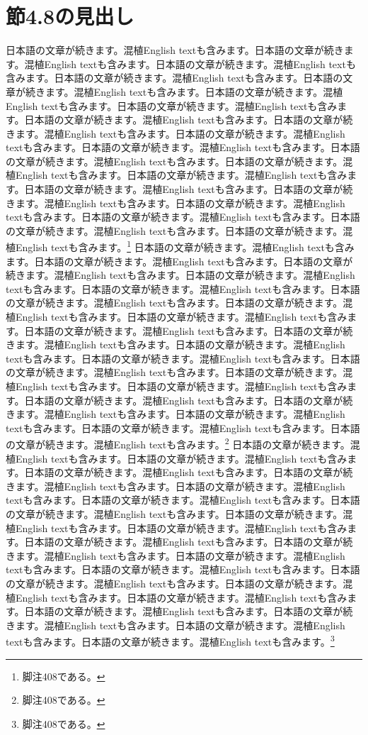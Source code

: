 \documentclass[pdflatex,book]{jlreq}
\begin{document}
\section{節4.8の見出し}
日本語の文章が続きます。混植English textも含みます。日本語の文章が続きます。混植English textも含みます。日本語の文章が続きます。混植English textも含みます。日本語の文章が続きます。混植English textも含みます。日本語の文章が続きます。混植English textも含みます。日本語の文章が続きます。混植English textも含みます。日本語の文章が続きます。混植English textも含みます。日本語の文章が続きます。混植English textも含みます。日本語の文章が続きます。混植English textも含みます。日本語の文章が続きます。混植English textも含みます。日本語の文章が続きます。混植English textも含みます。日本語の文章が続きます。混植English textも含みます。日本語の文章が続きます。混植English textも含みます。日本語の文章が続きます。混植English textも含みます。日本語の文章が続きます。混植English textも含みます。日本語の文章が続きます。混植English textも含みます。日本語の文章が続きます。混植English textも含みます。日本語の文章が続きます。混植English textも含みます。日本語の文章が続きます。混植English textも含みます。日本語の文章が続きます。混植English textも含みます。\footnote{脚注408である。}
日本語の文章が続きます。混植English textも含みます。日本語の文章が続きます。混植English textも含みます。日本語の文章が続きます。混植English textも含みます。日本語の文章が続きます。混植English textも含みます。日本語の文章が続きます。混植English textも含みます。日本語の文章が続きます。混植English textも含みます。日本語の文章が続きます。混植English textも含みます。日本語の文章が続きます。混植English textも含みます。日本語の文章が続きます。混植English textも含みます。日本語の文章が続きます。混植English textも含みます。日本語の文章が続きます。混植English textも含みます。日本語の文章が続きます。混植English textも含みます。日本語の文章が続きます。混植English textも含みます。日本語の文章が続きます。混植English textも含みます。日本語の文章が続きます。混植English textも含みます。日本語の文章が続きます。混植English textも含みます。日本語の文章が続きます。混植English textも含みます。日本語の文章が続きます。混植English textも含みます。日本語の文章が続きます。混植English textも含みます。日本語の文章が続きます。混植English textも含みます。\footnote{脚注408である。}
日本語の文章が続きます。混植English textも含みます。日本語の文章が続きます。混植English textも含みます。日本語の文章が続きます。混植English textも含みます。日本語の文章が続きます。混植English textも含みます。日本語の文章が続きます。混植English textも含みます。日本語の文章が続きます。混植English textも含みます。日本語の文章が続きます。混植English textも含みます。日本語の文章が続きます。混植English textも含みます。日本語の文章が続きます。混植English textも含みます。日本語の文章が続きます。混植English textも含みます。日本語の文章が続きます。混植English textも含みます。日本語の文章が続きます。混植English textも含みます。日本語の文章が続きます。混植English textも含みます。日本語の文章が続きます。混植English textも含みます。日本語の文章が続きます。混植English textも含みます。日本語の文章が続きます。混植English textも含みます。日本語の文章が続きます。混植English textも含みます。日本語の文章が続きます。混植English textも含みます。日本語の文章が続きます。混植English textも含みます。日本語の文章が続きます。混植English textも含みます。\footnote{脚注408である。}
\end{document}
